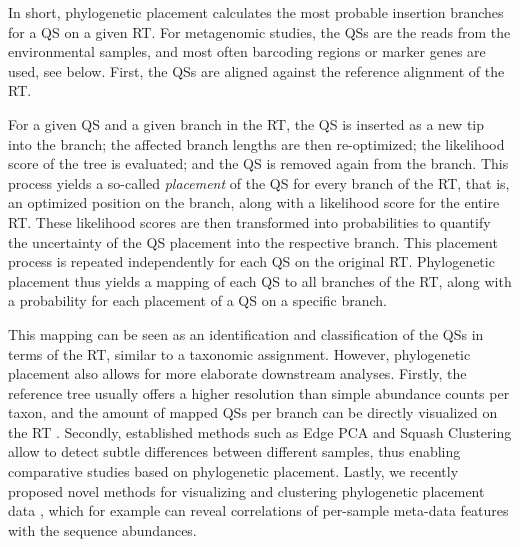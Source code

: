 \documentclass{bioinfo}
\newcommand\toolname{\textsc}
\newcommand\alexis[1]{{\color{orange}{#1}}}
\newcommand\nicetohave[1]{{\color{RoyalBlue}{#1}}}
\renewcommand\alexis[1]{}
\renewcommand\nicetohave[1]{}
\begin{document}
In short, phylogenetic placement calculates the most probable insertion branches for a \acf{QS} on a given \acf{RT}.
For metagenomic studies, the \acp{QS} are the reads from the environmental samples,
and most often barcoding regions or marker genes are used, see below.
First, the \acp{QS} are aligned against the reference alignment of the \ac{RT}.
\alexis{schaun wir mal wie lang der text wird, wenn es reicht sollte die aligner rein}
\nicetohave{
, using programs such as \toolname{PaPaRa} \citep{Berger2011a,Berger2012} or
\toolname{hmmalign}, which is a subprogram of the \toolname{HMMER} suite \citep{Eddy1998,Eddy2009}.
} %
For a given \ac{QS} and a given branch in the \ac{RT},
the \ac{QS} is inserted as a new tip into the branch;
the affected branch lengths are then re-optimized;
the likelihood score of the tree is evaluated;
and the \ac{QS} is removed again from the branch.
This process yields a so-called \emph{placement} of the \ac{QS} for every branch of the \ac{RT},
that is, an optimized position on the branch, along with a likelihood score for the entire \ac{RT}.
These likelihood scores are then transformed into probabilities
to quantify the uncertainty of the \ac{QS} placement into the respective branch.
\nicetohave{\citep{Strimmer2002,VonMering2007}} %
This placement process is repeated independently for each \ac{QS} on the original \ac{RT}.
Phylogenetic placement thus yields a mapping of each \ac{QS} to all branches of the \ac{RT},
along with a probability for each placement of a \ac{QS} on a specific branch.

This mapping can be seen as an identification and classification of the \acp{QS} in terms of the \ac{RT},
similar to a taxonomic assignment.
However, phylogenetic placement also allows for more elaborate downstream analyses.
Firstly, the reference tree usually offers a higher resolution than simple abundance counts per taxon,
and the amount of mapped \acp{QS} per branch can be directly visualized on the \ac{RT} \citep{Mahe2017}.
Secondly, established methods such as Edge PCA and Squash Clustering \citep{Matsen2011a}
allow to detect subtle differences between different samples,
thus enabling comparative studies based on phylogenetic placement.
Lastly, we recently proposed novel methods for visualizing and clustering phylogenetic placement data \citep{Czech2018a},
which for example can reveal correlations of per-sample meta-data features with the sequence abundances.
\end{document}
